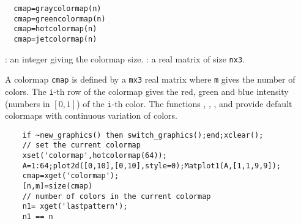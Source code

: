 \begin{mandesc}
  \\ %
  \\ %
  \\ %
  \\ %
  \\ %
\end{mandesc}
\begin{calling_sequence}
\begin{verbatim}
  cmap=graycolormap(n)
  cmap=greencolormap(n)
  cmap=hotcolormap(n)
  cmap=jetcolormap(n)
\end{verbatim}
\end{calling_sequence}
\begin{parameters}
  \begin{varlist}
    : an integer giving the colormap size.
    : a real matrix of size \verb!nx3!.
\end{varlist}
\end{parameters}
\begin{mandescription}
  A colormap \verb!cmap! is defined by a \verb!mx3! real matrix where \verb!m!
  gives the number of colors. The \verb!i!-th row of the colormap gives the
  red, green and blue intensity (numbers in $[0,1]$) of the \verb!i!-th color.
  The functions ,
  , ,
  and  provide default colormaps with
  continuous variation of colors.
\end{mandescription}
\begin{examples}
  \begin{Verbatim}
    if ~new_graphics() then switch_graphics();end;xclear();
    // set the current colormap
    xset('colormap',hotcolormap(64));
    A=1:64;plot2d([0,10],[0,10],style=0);Matplot1(A,[1,1,9,9]);
    cmap=xget('colormap');
    [n,m]=size(cmap)
    // number of colors in the current colormap
    n1= xget('lastpattern');
    n1 == n
  \end{Verbatim}
\end{examples}
